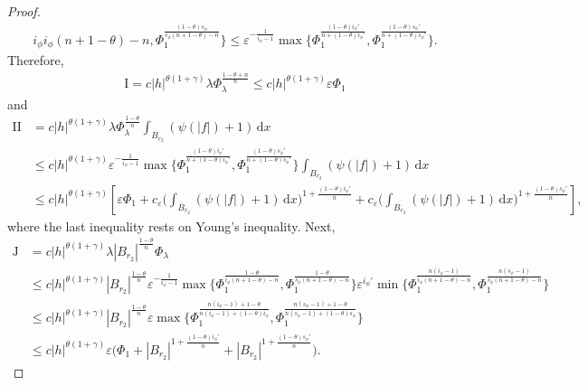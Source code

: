 \documentclass[leqno,11pt]{amsart}%
\numberwithin{equation}{section}
\newcommand{\eps}{\varepsilon}
\def\d{\mathrm{d}}
\def\dx{\d x}
\theoremstyle{definition}
\numberwithin{equation}{section}
\begin{document}
\begin{proof}
\begin{align*}
{{  {i_\phi}}{{i_\phi}(n+{1-\theta})-n}},\Phi_1^{\frac{({1-\theta}) {s_\phi}}{{s_\phi}(n+{1-\theta})-n}}\Big\}
  \le
  \eps^{-\frac{1}{{i_\phi}-1}}\max\Big\{\Phi_1^{\frac{ ({1-\theta})
  {i_\phi'}}{n+({1-\theta}) {i_\phi'}}},\Phi_1^{\frac{({1-\theta}) {s_\phi'}}{n+({1-\theta}) {s_\phi'}}}\Big\}.
\end{align*}
Therefore, 
\begin{align}\label{june5}
  \mathrm{I}
  =
  c|h|^{ {\theta(1+\gamma)}}\lambda \Phi_\lambda^{\frac{{1-\theta}+n}{n}}
  \le
  c|h|^{{\theta(1+\gamma)}}\eps \Phi_1
\end{align}
and
\begin{align}\label{june6}
  \mathrm{II}
  &=
  c|h|^{ {\theta(1+\gamma)}}\lambda \Phi_\lambda^{\frac{{1-\theta}}{n}}\int_{B_{r_2}}(\psi(|f|)+1)\,\dx\\
  & \nonumber \le
  c|h|^{ {\theta(1+\gamma)}}\eps^{-\frac{1}{{i_\phi}-1}}
    \max\Big\{\Phi_1^{\frac{({1-\theta}) {i_\phi'}}{n+({1-\theta})
    {i_\phi'}}},\Phi_1^{\frac{ ({1-\theta}) {s_\phi'}}{n+({1-\theta})
    {s_\phi'}}}\Big\}\int_{B_{r_2}}(\psi(|f|)+1)\,\dx\\
  & \nonumber \le
    c|h|^{ {\theta(1+\gamma)}}\left[\eps\Phi_1+c_\eps\bigg(\int_{B_{r_2}}(\psi(|f|)+1)\,\dx\bigg)^{1+\frac{({1-\theta}) {i_\phi'}}{n}}+c_\eps\bigg(\int_{B_{r_2}}(\psi(|f|)+1)\,\dx\bigg)^{1+\frac{({1-\theta}){s_\phi'}}{n}}\right],
\end{align}
where the last inequality 
rests on Young's inequality. 
Next, 
\begin{align}
    \label{june3}
    \mathrm{J} & = c |h|^{ {\theta(1+\gamma)}}\lambda|B_{r_2}|^{\frac{{1-\theta}}{n}}
     \Phi_\lambda \\ \nonumber &\leq c |h|^{{\theta(1+\gamma)}}|B_{r_2}|^{\frac{{1-\theta}}{n}} \eps^{-\frac{1}{{i_\phi}-1}}\max\Big\{\Phi_1^\frac{{1-\theta}}{{i_\phi}(n+{1-\theta})-n},\Phi_1^\frac{{1-\theta}}{{s_\phi}(n+{1-\theta})-n}\Big\}\eps^{{i_\phi'}}\min\Big\{\Phi_1^{\frac{n({i_\phi}-1)}{{i_\phi}(n+{1-\theta})-n}},\Phi_1^{\frac{n({s_\phi}-1)}{{s_\phi}(n+{1-\theta})-n}}\Big\}
     \\ \nonumber &\leq  c |h|^{ {\theta(1+\gamma)}}|B_{r_2}|^{\frac{{1-\theta}}{n}} \eps \max\Big\{\Phi_1^\frac{n({i_\phi}-1)+{1-\theta}}{n({i_\phi}-1)+({1-\theta}){i_\phi}},\Phi_1^\frac{n({s_\phi}-1)+{1-\theta}}{n({s_\phi}-1)+({1-\theta}) {s_\phi}}\Big\}
     \\ \nonumber
     &\leq  
     c |h|^{\theta(1+\gamma)} \eps \Big(\Phi_1 + |B_{r_2}|^{1+\frac{({1-\theta}) i_\phi'}{n}}+|B_{r_2}|^{1+\frac{({1-\theta}) s_\phi'}{n}}\Big).     

\end{align}
\end{proof}
\end{document}
